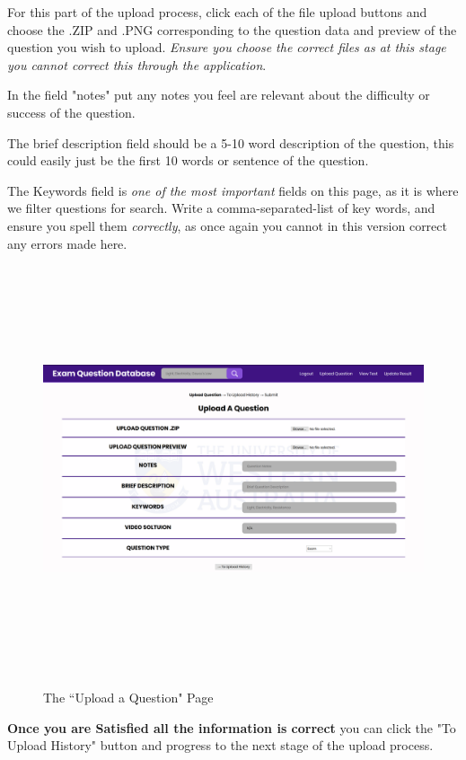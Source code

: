 \documentclass[12pt, a4paper, titlepage]{book}
\begin{document}
For this part of the upload process, click each of the file upload buttons and choose the .ZIP and .PNG corresponding to the question data and preview of the question you wish to upload. \textit{Ensure you choose the correct files as at this stage you cannot correct this through the application}.\par
In the field "notes" put any notes you feel are relevant about the difficulty or success of the question.\par The brief description field should be a 5-10 word description of the question, this could easily just be the first 10 words or sentence of the question.\par The Keywords field is \textit{one of the most important} fields on this page, as it is where we filter questions for search. Write a comma-separated-list of key words, and ensure you spell them \textit{correctly}, as once again you cannot in this version correct any errors made here.
\begin{figure}[H]
\centering
\includegraphics[width = 16cm, height = 12cm]{upload.png}
\label{fig:upload}
\caption{The ``Upload a Question" Page}
\end{figure}
\textbf{Once you are Satisfied all the information is correct} you can click the "To Upload History" button and progress to the next stage of the upload process.\pagebreak
\end{document}
